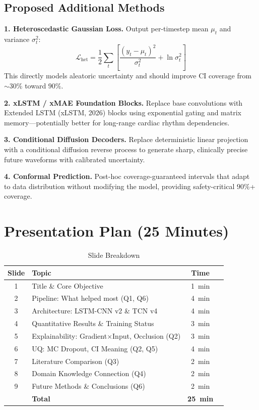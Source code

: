 \documentclass[10pt,journal,compsoc]{IEEEtran}
\begin{document}
\subsection{Proposed Additional Methods}

\textbf{1. Heteroscedastic Gaussian Loss.} Output per-timestep mean $\mu_t$ and variance $\sigma_t^2$:
\begin{equation}
    \mathcal{L}_{\text{het}} = \frac{1}{2}\sum_t \left[\frac{(y_t - \mu_t)^2}{\sigma_t^2} + \ln \sigma_t^2\right]
\end{equation}
This directly models aleatoric uncertainty and should improve CI coverage from $\sim$30\% toward $90\%$.

\textbf{2. xLSTM / xMAE Foundation Blocks.} Replace base convolutions with Extended LSTM (xLSTM, 2026) blocks using exponential gating and matrix memory---potentially better for long-range cardiac rhythm dependencies.

\textbf{3. Conditional Diffusion Decoders.} Replace deterministic linear projection with a conditional diffusion reverse process to generate sharp, clinically precise future waveforms with calibrated uncertainty.

\textbf{4. Conformal Prediction.} Post-hoc coverage-guaranteed intervals that adapt to data distribution without modifying the model, providing safety-critical $90\%$+ coverage.

\section{Presentation Plan (25 Minutes)}
\label{sec:presentation}

\begin{table}[h]
\caption{Slide Breakdown}
\label{tab:slides}
\centering
\begin{tabular}{clcr}
\toprule
\textbf{Slide} & \textbf{Topic} & \textbf{Time} \\
\midrule
1 & Title \& Core Objective & 1~min \\
2 & Pipeline: What helped most (Q1, Q6) & 4~min \\
3 & Architecture: LSTM-CNN v2 \& TCN v4 & 4~min \\
4 & Quantitative Results \& Training Status & 3~min \\
5 & Explainability: Gradient$\times$Input, Occlusion (Q2) & 3~min \\
6 & UQ: MC Dropout, CI Meaning (Q2, Q5) & 4~min \\
7 & Literature Comparison (Q3) & 2~min \\
8 & Domain Knowledge Connection (Q4) & 2~min \\
9 & Future Methods \& Conclusions (Q6) & 2~min \\
\midrule
& \textbf{Total} & \textbf{25~min} \\
\bottomrule
\end{tabular}
\end{table}
\end{document}
